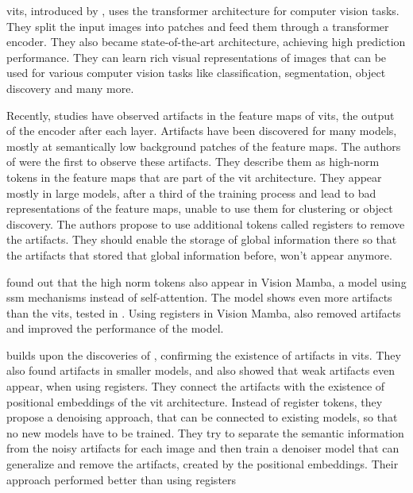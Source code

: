 \documentclass[conference]{IEEEtran}
\begin{document}
  \acfp{vit}, introduced by \cite{visiontransformers2021}, uses the transformer architecture for computer vision tasks. They split the input images into patches and feed them through a transformer encoder. They also became state-of-the-art architecture, achieving high prediction performance. They can learn rich visual representations of images that can be used for various computer vision tasks like classification, segmentation, object discovery and many more. \cite{visiontransformers2021} \cite{vit-state-challenges}

  Recently, studies have observed artifacts in the feature maps of \acp{vit}, the output of the encoder after each layer. Artifacts have been discovered for many models, mostly at semantically low background patches of the feature maps. \cite{registers} \cite{denoising} The authors of \cite{registers} were the first to observe these artifacts. They describe them as high-norm tokens in the feature maps that are part of the \ac{vit} architecture. They appear mostly in large models, after a third of the training process and lead to bad representations of the feature maps, unable to use them for clustering or object discovery. The authors propose to use additional tokens called registers to remove the artifacts. They should enable the storage of global information there so that the artifacts that stored that global information before, won't appear anymore.

  \cite{mamba-needs-registers} found out that the high norm tokens also appear in Vision Mamba, a model using \ac{ssm} mechanisms instead of self-attention. The model shows even more artifacts than the \acp{vit}, tested in \cite{registers}. Using registers in Vision Mamba, also removed artifacts and improved the performance of the model. \cite{mamba-needs-registers}

  \cite{denoising} builds upon the discoveries of \cite{registers}, confirming the existence of artifacts in \acp{vit}. They also found artifacts in smaller models, and also showed that weak artifacts even appear, when using registers. They connect the artifacts with the existence of positional embeddings of the \ac{vit} architecture. Instead of register tokens, they propose a denoising approach, that can be connected to existing models, so that no new models have to be trained. They try to separate the semantic information from the noisy artifacts for each image and then train a denoiser model that can generalize and remove the artifacts, created by the positional embeddings. Their approach performed better than using registers \cite{denoising}
\end{document}
